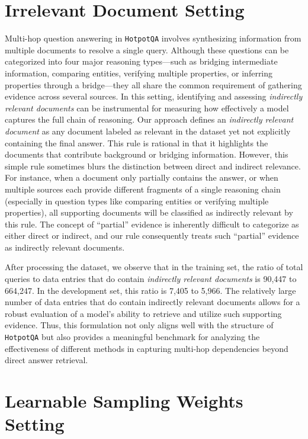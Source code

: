 \section{Irrelevant Document Setting}\label{sec: appendix_indirectly relevant documents setting}
Multi-hop question answering in \texttt{HotpotQA} involves synthesizing information from multiple documents to resolve a single query. Although these questions can be categorized into four major reasoning types---such as bridging intermediate information, comparing entities, verifying multiple properties, or inferring properties through a bridge---they all share the common requirement of gathering evidence across several sources. In this setting, identifying and assessing \emph{indirectly relevant documents} can be instrumental for measuring how effectively a model captures the full chain of reasoning. Our approach defines an \emph{indirectly relevant document} as any document labeled as relevant in the dataset yet not explicitly containing the final answer. This rule is rational in that it highlights the documents that contribute background or bridging information. However, this simple rule sometimes blurs the distinction between direct and indirect relevance. For instance, when a document only partially contains the answer, or when multiple sources each provide different fragments of a single reasoning chain (especially in question types like comparing entities or verifying multiple properties), all supporting documents will be classified as indirectly relevant by this rule. The concept of “partial” evidence is inherently difficult to categorize as either direct or indirect, and our rule consequently treats such “partial” evidence as indirectly relevant documents.

After processing the dataset, we observe that in the training set, the ratio of total queries to data entries that do contain \emph{indirectly relevant documents} is 90,447 to 664,247. In the development set, this ratio is 7,405 to 5,966. The relatively large number of data entries that do contain indirectly relevant documents allows for a robust evaluation of a model’s ability to retrieve and utilize such supporting evidence. Thus, this formulation not only aligns well with the structure of \texttt{HotpotQA} but also provides a meaningful benchmark for analyzing the effectiveness of different methods in capturing multi-hop dependencies beyond direct answer retrieval.


\section{Learnable Sampling Weights Setting}\label{sec: appendix_Learnable Sampling Weights}

